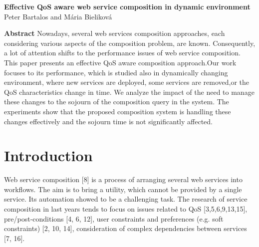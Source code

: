 \documentclass[10pt]{llncs}
\begin{document}
\thispagestyle{plain}
\begin{flushleft}
\LARGE
\textbf{Effective QoS aware web service composition in dynamic environment}
\\
\normalsize
\vspace{20pt}
Peter Bartalos and M\'{a}ria Bielikov\'{a}
\end{flushleft}
\vspace{80pt}
\textbf{Abstract} Nowadays, several web services composition approaches, each considering various aspects of the composition problem, are known. Consequently, a lot of attention shifts to the performance issues of web service composition. This paper presents an effective QoS aware  composition approach.Our work focuses to its performance, which is studied also in dynamically changing environment, where new services are deployed, some services are removed,or the QoS characteristics change in time. We analyze the impact of the need to manage these changes to the sojourn of the composition query in the system. The experiments show that the proposed composition system is handling these changes effectively and the sojourn time is not signiﬁcantly affected.

\section{Introduction}
Web service composition [8] is a process of arranging several web services into workﬂows. The aim is to bring a utility, which cannot be provided by a single service. Its automation showed to be a challenging task. The research of service composition in last years tends to focus on issues related to QoS [3,5,6,9,13,15], pre/post-conditions [4, 6, 12], user constraints and preferences (e.g. soft constraints) [2, 10, 14], consideration of complex dependencies between services [7, 16].
\end{document}
